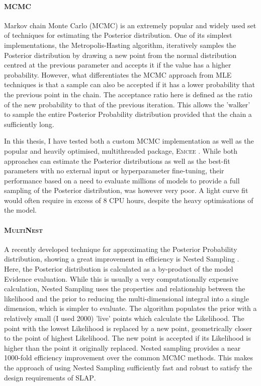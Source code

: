 \paragraph{MCMC}
Markov chain Monte Carlo (MCMC) is an extremely popular and widely used set of techniques for estimating the Posterior distribution. One of its simplest implementations, the Metropolis-Hasting algorithm, iteratively samples the Posterior distribution by drawing a new point from the normal distribution centred at the previous parameter and accepts it if the value has a higher probability. However, what differentiates the MCMC approach from MLE techniques is that a sample can also be accepted if it has a lower probability that the previous point in the chain. The acceptance ratio here is defined as the ratio of the new probability to that of the previous iteration. This allows the 'walker' to sample the entire Posterior Probability distribution provided that the chain a sufficiently long.

In this thesis, I have tested both a custom MCMC implementation as well as the popular and heavily optimised, multithreaded package, \textsc{Emcee} \citep{Foreman-Mackey2012}. While both approaches can estimate the Posterior distributions as well as the best-fit parameters with no external input or hyperparameter fine-tuning, their performance based on a need to evaluate millions of models to provide a full sampling of the Posterior distribution, was however very poor. A light curve fit would often require in excess of 8 CPU hours, despite the heavy optimisations of the model.

\paragraph{\textsc{MultiNest}}
A recently developed technique for approximating the Posterior Probability distribution, showing a great improvement in efficiency is Nested Sampling \citep{Skilling2006}. Here, the Posterior distribution is calculated as a by-product of the model Evidence evaluation. While this is usually a very computationally expensive calculation, Nested Sampling uses the properties and relationship between the likelihood and the prior to reducing the multi-dimensional integral into a single dimension, which is simpler to evaluate. The algorithm populates the prior with a relatively small (I used 2000) 'live' points which calculate the Likelihood. The point with the lowest Likelihood is replaced by a new point, geometrically closer to the point of highest Likelihood. The new point is accepted if its Likelihood is higher than the point it originally replaced. Nested sampling provides a near 1000-fold efficiency improvement over the common MCMC methods. This makes the approach of using Nested Sampling sufficiently fast and robust to satisfy the design requirements of \textsc{SLAP}.

